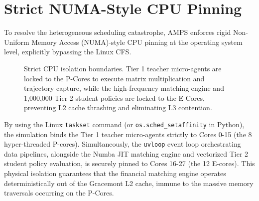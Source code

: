 \section{Strict NUMA-Style CPU Pinning}

To resolve the heterogeneous scheduling catastrophe, AMPS enforces rigid Non-Uniform Memory Access (NUMA)-style CPU pinning at the operating system level, explicitly bypassing the Linux CFS.

\begin{figure}[htbp]
\centering
{}
\caption{Strict CPU isolation boundaries. Tier 1 teacher micro-agents are locked to the P-Cores to execute matrix multiplication and trajectory capture, while the high-frequency matching engine and 1,000,000 Tier 2 student policies are locked to the E-Cores, preventing L2 cache thrashing and eliminating L3 contention.}
\label{fig:cpu_pinning_detail}
\end{figure}

By using the Linux \texttt{taskset} command (or \texttt{os.sched\_setaffinity} in Python), the simulation binds the Tier 1 teacher micro-agents strictly to Cores 0-15 (the 8 hyper-threaded P-cores). Simultaneously, the \texttt{uvloop} event loop orchestrating data pipelines, alongside the Numba JIT matching engine and vectorized Tier 2 student policy evaluation, is securely pinned to Cores 16-27 (the 12 E-cores). This physical isolation guarantees that the financial matching engine operates deterministically out of the Gracemont L2 cache, immune to the massive memory traversals occurring on the P-Cores.

